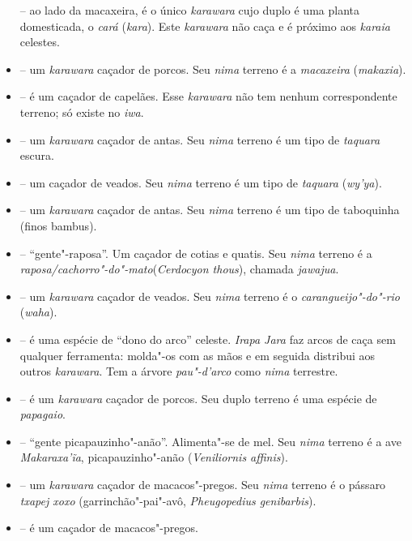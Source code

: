 \begin{itemize}
  \emph{} -- ao lado da macaxeira, é o único
  \emph{karawara} cujo duplo é uma planta domesticada, o \emph{cará}
  (\emph{kara}). Este \emph{karawara} não caça e é próximo aos
  \emph{karaia} celestes.
\item
  \emph{} -- um \emph{karawara} caçador de porcos. Seu
  \emph{nima} terreno é a \emph{macaxeira} (\emph{makaxia}).
\item
  \emph{} -- é um caçador de capelães. Esse
  \emph{karawara} não tem nenhum correspondente terreno; só existe no
  \emph{iwa}.
\item
  \emph{} -- um \emph{karawara} caçador de
  antas. Seu \emph{nima} terreno é um tipo de \emph{taquara} escura.
\item
  \emph{} -- um caçador de veados. Seu \emph{nima}
  terreno é um tipo de \emph{taquara} (\emph{wy'ya}).
\item
  \emph{} -- um \emph{karawara} caçador de antas. Seu
  \emph{nima} terreno é um tipo de taboquinha (finos bambus).
\item
  \emph{} -- ``gente"-raposa''. Um caçador de cotias e
  quatis. Seu \emph{nima} terreno é a
  \emph{raposa/cachorro"-do"-mato}(\emph{Cerdocyon
  thous}), chamada \emph{jawajua}.
\item
  \emph{} -- um \emph{karawara} caçador de veados. Seu
  \emph{nima} terreno é o \emph{carangueijo"-do"-rio} (\emph{waha}).
\item
  \emph{} -- é uma espécie de ``dono do arco'' celeste.
  \emph{Irapa Jara} faz arcos de caça sem qualquer ferramenta:
  molda"-os com as mãos e em seguida distribui aos outros
  \emph{karawara}. Tem a árvore \emph{pau"-d'arco} como \emph{nima}
  terrestre.
\item
  \emph{} -- é um \emph{karawara} caçador de porcos.
  Seu duplo terreno é uma espécie de \emph{papagaio}.
\item
  \emph{} -- ``gente picapauzinho"-anão''.
  Alimenta"-se de mel. Seu \emph{nima} terreno é a ave
  \emph{Makaraxa'ĩa}, picapauzinho"-anão (\emph{Veniliornis affinis}).
\item
  \emph{} -- um \emph{karawara} caçador de
  macacos"-pregos. Seu \emph{nima} terreno é o pássaro \emph{txapej xoxo}
  (garrinchão"-pai"-avô, \emph{Pheugopedius genibarbis}).
\item
   -- é um caçador de macacos"-pregos.

\end{itemize}
